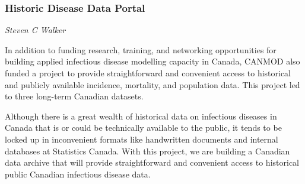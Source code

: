 \subsubsection{Historic Disease Data Portal}

\textit{Steven C Walker}

In addition to funding research, training, and networking opportunities for building applied infectious disease modelling capacity in Canada, CANMOD also funded a project to provide straightforward and convenient access to historical and publicly available incidence, mortality, and population data. This project led to three long-term Canadian datasets.

Although there is a great wealth of historical data on infectious diseases in Canada that is or could be technically available to the public, it tends to be locked up in inconvenient formats like handwritten documents and internal databases at Statistics Canada. With this project, we are building a Canadian data archive that will provide straightforward and convenient access to historical public Canadian infectious disease data.

